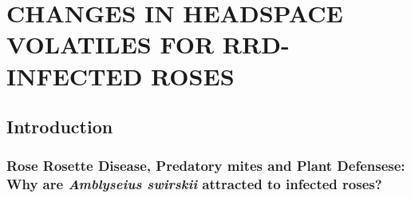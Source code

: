 \documentclass[12pt,final,CPage]{ufthesis}
\begin{document}
{  \clearpage

  

  \hypertarget{chemeco}{%
  \chapter{CHANGES IN HEADSPACE VOLATILES FOR RRD-INFECTED ROSES}\label{chemeco}}

  \hypertarget{intro-swirskii-vocs}{%
  \section{Introduction}\label{intro-swirskii-vocs}}

  \hypertarget{intro-swirskii}{%
  \subsection{\texorpdfstring{Rose Rosette Disease, Predatory mites and Plant Defensese: Why are \emph{Amblyseius swirskii} attracted to infected roses?}{Rose Rosette Disease, Predatory mites and Plant Defensese: Why are Amblyseius swirskii attracted to infected roses?}}\label{intro-swirskii}}

}
\end{document}
